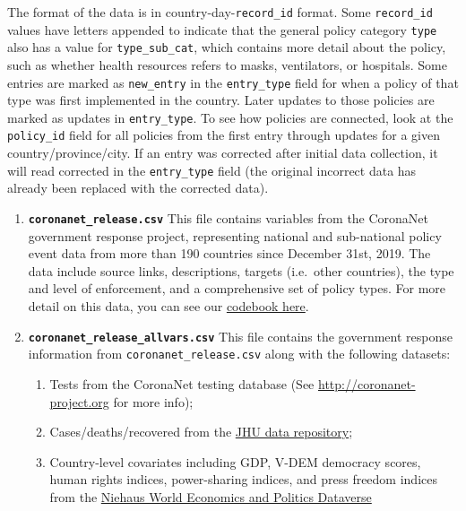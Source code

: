 \documentclass[
]{article}
\providecommand{\tightlist}{%
  \setlength{\itemsep}{0pt}\setlength{\parskip}{0pt}}
\begin{document}
The format of the data is in country-day-\texttt{record\_id} format. Some \texttt{record\_id} values have letters appended to indicate that the general policy category \texttt{type} also has a value for \texttt{type\_sub\_cat}, which contains more detail about the policy, such as whether health resources refers to masks, ventilators, or hospitals. Some entries are marked as \texttt{new\_entry} in the \texttt{entry\_type} field for when a policy of that type was first implemented in the country. Later updates to those policies are marked as updates in \texttt{entry\_type}. To see how policies are connected, look at the \texttt{policy\_id} field for all policies from the first entry through updates for a given country/province/city. If an entry was corrected after initial data collection, it will read corrected in the \texttt{entry\_type} field (the original incorrect data has already been replaced with the corrected data).

\begin{enumerate}
\def\labelenumi{\arabic{enumi}.}
\item
  \textbf{\texttt{coronanet\_release.csv}} This file contains variables from the CoronaNet government response project, representing national and sub-national policy event data from more than 190 countries since December 31st, 2019. The data include source links, descriptions, targets (i.e.~other countries), the type and level of enforcement, and a comprehensive set of policy types. For more detail on this data, you can see our \href{https://docs.google.com/document/d/1zvNMpwj0onFvUZ_gLl4RRjqS-clbHv3TIX6EOHofsME}{codebook here}.
\item
  \textbf{\texttt{coronanet\_release\_allvars.csv}} This file contains the government response information from \texttt{coronanet\_release.csv} along with the following datasets:

  \begin{enumerate}
  \def\labelenumii{\alph{enumii}.}
  \tightlist
  \item
    Tests from the CoronaNet testing database (See \url{http://coronanet-project.org} for more info);
  \item
    Cases/deaths/recovered from the \href{https://github.com/CSSEGISandData/COVID-19}{JHU data repository};
  \item
    Country-level covariates including GDP, V-DEM democracy scores, human rights indices, power-sharing indices, and press freedom indices from the \href{https://niehaus.princeton.edu/news/world-economics-and-politics-dataverse}{Niehaus World Economics and Politics Dataverse}
  \end{enumerate}
\end{enumerate}
\end{document}
